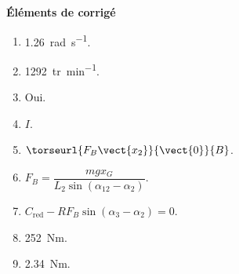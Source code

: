 \footnotesize
%
\ifcolle
\else
\ifnormal
\vspace{.5cm}
\noindent \textbf{Éléments de corrigé}
\vspace{-.5cm}
\begin{multicols}{2}
\begin{enumerate}
\item \SI{1,26}{rad.s^{-1}}.
\item \SI{1292}{tr.min^{-1}}.
\item Oui.
\item $I$.
\item  $\torseurl{ F_B\vect{x_{2}}}{\vect{0}}{B}$.
\item $ F_B    = \dfrac{mgx_G}{L_2  \sin  \left(\alpha_{12}-\alpha_2\right)} $.
\item $C_{\text{red}}-RF_B \sin \left( \alpha_3 - \alpha_2\right) = 0$.
\item \SI{252}{Nm}.
\item \SI{2,34}{Nm}.
\end{enumerate}
\end{multicols}
\else
\fi
\fi
\fi

\normalsize

